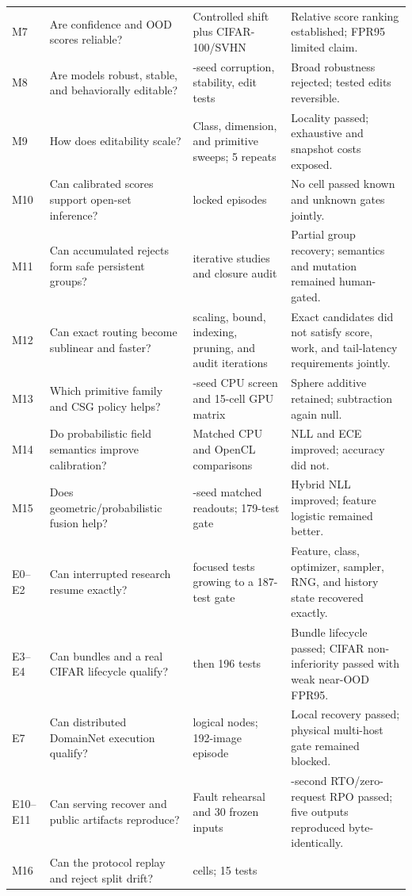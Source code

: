 \documentclass[12pt,oneside]{report}
\begin{document}
\begin{longtable}{
>{\raggedright\arraybackslash}p{0.6in}
>{\raggedright\arraybackslash}p{1.45in}
>{\raggedright\arraybackslash}p{0.9in}
>{\raggedright\arraybackslash}p{1.95in}}
M7 & Are confidence and OOD scores reliable? & Controlled shift plus
CIFAR-100/SVHN & Relative score ranking established; FPR95 limited claim.\\
M8 & Are models robust, stable, and behaviorally editable? & 5-seed corruption,
stability, edit tests & Broad robustness rejected; tested edits reversible.\\
M9 & How does editability scale? & Class, dimension, and primitive sweeps; 5 repeats &
Locality passed; exhaustive and snapshot costs exposed.\\
M10 & Can calibrated scores support open-set inference? & 3 locked episodes &
No cell passed known and unknown gates jointly.\\
M11 & Can accumulated rejects form safe persistent groups? & 40 iterative
studies and closure audit & Partial group recovery; semantics and mutation
remained human-gated.\\
M12 & Can exact routing become sublinear and faster? & 8 scaling, bound,
indexing, pruning, and audit iterations & Exact candidates did not satisfy
score, work, and tail-latency requirements jointly.\\
M13 & Which primitive family and CSG policy helps? & 5-seed CPU screen and
15-cell GPU matrix & Sphere additive retained; subtraction again null.\\
M14 & Do probabilistic field semantics improve calibration? & Matched
CPU and OpenCL comparisons & NLL and ECE improved; accuracy did not.\\
M15 & Does geometric/probabilistic fusion help? & 5-seed matched readouts;
179-test gate & Hybrid NLL improved; feature logistic remained better.\\
E0--E2 & Can interrupted research resume exactly? & 19 focused tests growing
to a 187-test gate & Feature, class, optimizer, sampler, RNG, and history state
recovered exactly.\\
E3--E4 & Can bundles and a real CIFAR lifecycle qualify? & 192 then 196 tests &
Bundle lifecycle passed; CIFAR non-inferiority passed with weak near-OOD FPR95.\\
E7 & Can distributed DomainNet execution qualify? & 3 logical nodes; 192-image
episode & Local recovery passed; physical multi-host gate remained blocked.\\
E10--E11 & Can serving recover and public artifacts reproduce? & Fault
rehearsal and 30 frozen inputs & 1-second RTO/zero-request RPO passed; five
outputs reproduced byte-identically.\\
M16 & Can the protocol replay and reject split drift? & 10 cells; 15 tests &

\end{longtable}
\end{document}
